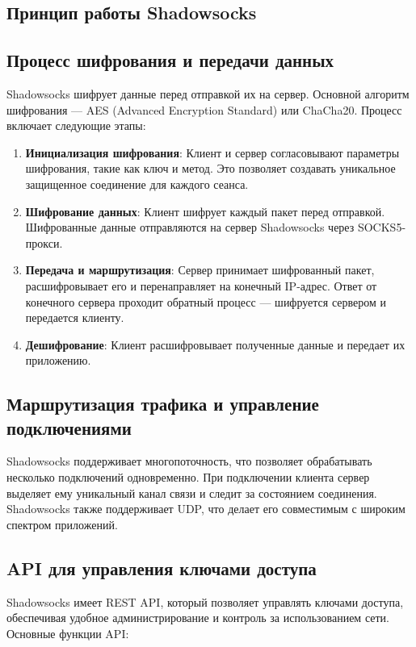\documentclass{SCWorks}
\begin{document}
\subsection{Принцип работы Shadowsocks}

\subsection{Процесс шифрования и передачи данных}
Shadowsocks шифрует данные перед отправкой их на сервер. Основной алгоритм шифрования — AES (Advanced Encryption Standard) или ChaCha20. Процесс включает следующие этапы:

\begin{enumerate}
    \item \textbf{Инициализация шифрования}: Клиент и сервер согласовывают параметры шифрования, такие как ключ и метод. Это позволяет создавать уникальное защищенное соединение для каждого сеанса.
    \item \textbf{Шифрование данных}: Клиент шифрует каждый пакет перед отправкой. Шифрованные данные отправляются на сервер Shadowsocks через SOCKS5-прокси.
    \item \textbf{Передача и маршрутизация}: Сервер принимает шифрованный пакет, расшифровывает его и перенаправляет на конечный IP-адрес. Ответ от конечного сервера проходит обратный процесс — шифруется сервером и передается клиенту.
    \item \textbf{Дешифрование}: Клиент расшифровывает полученные данные и передает их приложению.
\end{enumerate}

\subsection{Маршрутизация трафика и управление подключениями}
Shadowsocks поддерживает многопоточность, что позволяет обрабатывать несколько подключений одновременно. При подключении клиента сервер выделяет ему уникальный канал связи и следит за состоянием соединения. Shadowsocks также поддерживает UDP, что делает его совместимым с широким спектром приложений.

\subsection{API для управления ключами доступа}
Shadowsocks имеет REST API, который позволяет управлять ключами доступа, обеспечивая удобное администрирование и контроль за использованием сети. Основные функции API:
\end{document}
